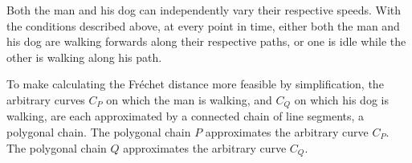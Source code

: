 Both the man and his dog can independently vary their respective speeds. With the conditions described above, at every point in time, either both the man and his dog are walking forwards along their respective paths, or one is idle while the other is walking along his path.

To make calculating the Fréchet distance more feasible by simplification, the arbitrary curves $C_P$ on which the man is walking, and $C_Q$ on which his dog is walking, are each approximated by a connected chain of line segments, a polygonal chain. The polygonal chain $P$ approximates the arbitrary curve $C_P$. The polygonal chain $Q$ approximates the arbitrary curve $C_Q$.



